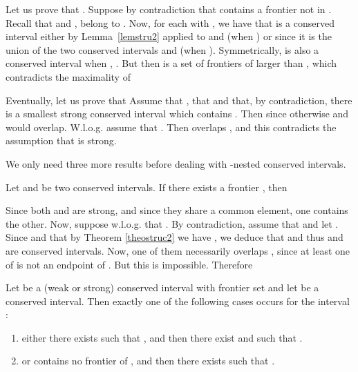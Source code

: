 \documentclass{article}
\begin{document}
\begin{preuve}
Let us prove that . Suppose by contradiction that 
contains a frontier  not in . Recall that  and 
,  belong to . Now, for each  with , we have that
 is a conserved interval either by Lemma~\ref{lemstru2} applied
to  and  (when ) or since it is the union
of the two conserved intervals  and  (when ). 
Symmetrically,  is also a conserved interval when , . 
But then  is a set of frontiers of  larger than , 
which contradicts the maximality of 

Eventually, let us prove that  Assume that
 , that  and that, by contradiction, there 
is a smallest strong conserved interval  which contains
. Then  since otherwise  and  would
overlap. W.l.o.g. assume that . Then 
overlaps , and this contradicts the assumption that  is strong.
\end{preuve}


We only need three more results before dealing with -nested conserved
intervals.

\begin{lemma}\label{memecontainer}
Let  and  be two conserved intervals. If there exists a frontier , 
then   
\end{lemma}

\begin{preuve}
Since both  and  are strong,
and since they share a common element, one contains the other. Now, suppose
w.l.o.g. that .  By contradiction,
assume that  and let
. Since  and that by Theorem
\ref{theostruc2} we have , we deduce that  and thus
 and  are conserved intervals. Now, one of them necessarily
overlaps , since at least one of  is not an endpoint of
. But this is impossible. Therefore  

\end{preuve}

\begin{lemma}
\label{coro1}
Let  be a (weak or strong) conserved interval with frontier set
 and let  be a conserved interval. Then
exactly one of the following cases occurs for the interval :
\begin{enumerate}
\item either there exists  such that , and then 
there exist  and  such that . 
\item or  contains no frontier of , and then there exists  such that
.
\end{enumerate}
\end{lemma}
\end{document}
